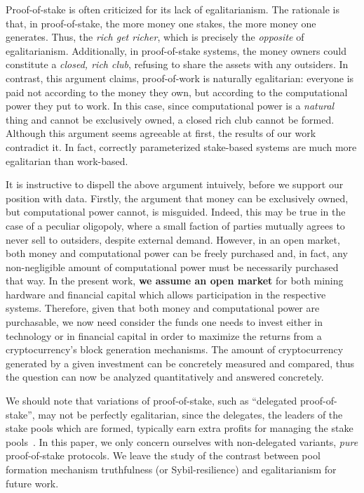 
Proof-of-stake is often criticized for its lack of egalitarianism. The
rationale is that, in proof-of-stake, the more money one stakes, the more money
one generates. Thus, the \emph{rich get richer}, which is precisely the
\emph{opposite} of egalitarianism. Additionally, in proof-of-stake systems, the
money owners could constitute a \emph{closed, rich club}, refusing to share the
assets with any outsiders.  In contrast, this argument claims, proof-of-work is
naturally egalitarian: everyone is paid not according to the money they own,
but according to the computational power they put to work. In this case, since
computational power is a \emph{natural} thing and cannot be exclusively owned,
a closed rich club cannot be formed.
Although this argument seems agreeable at first, the results of our work contradict it.
In fact, correctly parameterized stake-based systems are much more egalitarian than work-based.

It is instructive to dispell the above argument intuively, before we support
our position with data. Firstly, the argument that money can be exclusively
owned, but computational power cannot, is misguided. Indeed, this may be true
in the case of a peculiar oligopoly, where a small faction of parties mutually
agrees to never sell to outsiders, despite external demand. However, in an open
market, both money and computational power can be freely purchased and, in
fact, any non-negligible amount of computational power must be necessarily
purchased that way.
In the present work, \textbf{we assume an open market} for both mining hardware
and financial capital which allows participation in the respective systems.
Therefore, given that both money and computational power
are purchasable, we now need consider the funds one needs to invest either in
technology or in financial capital in order to maximize the returns from a
cryptocurrency's block generation mechanisms. The amount of cryptocurrency
generated by a given investment can be concretely measured and compared, thus
the question can now be analyzed quantitatively and answered concretely.

We should
note that variations of proof-of-stake, such as ``delegated proof-of-stake'',
may not be perfectly egalitarian, since the delegates, \ie the leaders of
the stake pools which are formed, typically earn extra profits for managing the
stake pools~\cite{stouka-koutsoupias-kiayias}. In this paper, we only concern
ourselves with non-delegated variants, \ie \emph{pure} proof-of-stake protocols.
We leave the study of the contrast between pool formation mechanism truthfulness
(or Sybil-resilience) and egalitarianism for future work.
